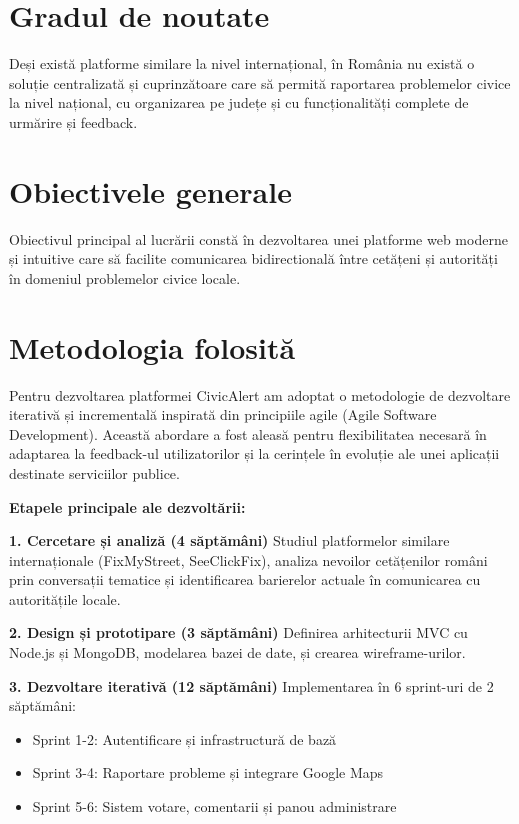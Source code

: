 \documentclass[12pt,a4paper]{report}
\begin{document}
\section*{Gradul de noutate}

Deși există platforme similare la nivel internațional, în România nu există o soluție centralizată și cuprinzătoare care să permită raportarea problemelor civice la nivel național, cu organizarea pe județe și cu funcționalități complete de urmărire și feedback.

\section*{Obiectivele generale}

Obiectivul principal al lucrării constă în dezvoltarea unei platforme web moderne și intuitive care să facilite comunicarea bidirectională între cetățeni și autorități în domeniul problemelor civice locale.

\section*{Metodologia folosită}

Pentru dezvoltarea platformei CivicAlert am adoptat o metodologie de dezvoltare iterativă și incrementală  inspirată din principiile agile (Agile Software Development).  Această abordare a fost aleasă pentru flexibilitatea necesară în adaptarea la feedback-ul utilizatorilor și la cerințele în evoluție ale unei aplicații destinate serviciilor publice.

\textbf{Etapele principale ale dezvoltării:}

\textbf{1. Cercetare și analiză (4 săptămâni)}
Studiul platformelor similare internaționale (FixMyStreet, SeeClickFix), analiza nevoilor cetățenilor români prin conversații tematice și identificarea barierelor actuale în comunicarea cu autoritățile locale.

\textbf{2. Design și prototipare (3 săptămâni)}
Definirea arhitecturii MVC cu Node.js și MongoDB, modelarea bazei de date, și crearea wireframe-urilor.

\textbf{3. Dezvoltare iterativă (12 săptămâni)}
Implementarea în 6 sprint-uri de 2 săptămâni:
\begin{itemize}
\item Sprint 1-2: Autentificare și infrastructură de bază
\item Sprint 3-4: Raportare probleme și integrare Google Maps
\item Sprint 5-6: Sistem votare, comentarii și panou administrare
\end{itemize}
\end{document}
